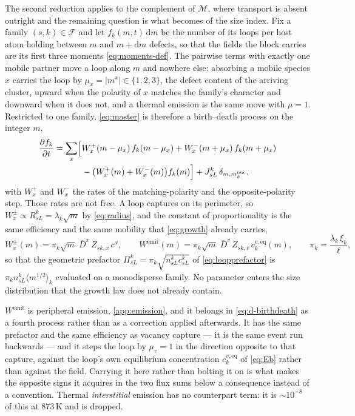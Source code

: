 The second reduction applies to the complement of $\mathcal M$, where transport
is absent outright and the remaining question is what becomes of the size index.
Fix a family $(s,k)\in\mathcal F$ and let $f_k(m,t)\,\mathrm dm$ be the number of
its loops per host atom holding between $m$ and $m+\mathrm dm$ defects, so that
the fields the block carries are its first three moments
\cref{eq:moments-def}. The pairwise terms with exactly one mobile partner move a
loop along $m$ and nowhere else: absorbing a mobile species $x$ carries the loop
by $\mu_x=|m^{x}|\in\{1,2,3\}$, the defect content of the arriving cluster,
upward when the polarity of $x$ matches the family's character and downward when
it does not, and a thermal emission is the same move with $\mu=1$. Restricted to
one family, \cref{eq:master} is therefore a birth--death process on the integer
$m$,
\begin{equation}
\begin{split}
  \frac{\partial f_k}{\partial t}=\sum_{x}\Bigl[
    &W^{+}_{x}(m-\mu_x)\,f_k(m-\mu_x)
    +W^{-}_{x}(m+\mu_x)\,f_k(m+\mu_x)\\
    &-\bigl(W^{+}_{x}(m)+W^{-}_{x}(m)\bigr)f_k(m)\Bigr]
    +J^k_{sL}\,\delta_{m,m^{\mathrm{nuc}}_k},
\end{split}
  \label{eq:d-birthdeath}
\end{equation}
with $W^{+}_{x}$ and $W^{-}_{x}$ the rates of the matching-polarity and the
opposite-polarity step. Those rates are not free. A loop captures on its
perimeter, so $W^{\pm}_{x}\propto R^k_{sL}=\lambda_k\sqrt m$ by
\cref{eq:radius}, and the constant of proportionality is the same efficiency and
the same mobility that \cref{eq:growth} already carries,
\begin{equation}
  W^{\pm}_{x}(m)=\pi_k\sqrt m\;\overline D^{x}\,Z_{sk,x}\,c^{x},
  \qquad
  W^{\mathrm{emit}}(m)=\pi_k\sqrt m\;\overline D^{v}\,Z_{sk,v}\,
    c^{v,\mathrm{eq}}_k(m),
  \qquad
  \pi_k=\frac{\lambda_k\,\xi_k}{\ell},
  \label{eq:d-Wrates}
\end{equation}
so that the geometric prefactor $\Pi^k_{sL}=\pi_k\sqrt{n^k_{sL}c^k_{sL}}$ of
\cref{eq:loopprefactor} is $\pi_kn^k_{sL}\langle m^{1/2}\rangle_k$ evaluated on a
monodisperse family. No parameter enters the size distribution that the growth
law does not already contain.

$W^{\mathrm{emit}}$ is peripheral emission, \cref{app:emission}, and it belongs
in \cref{eq:d-birthdeath} as a fourth process rather than as a correction
applied afterwards. It has the same prefactor and the same efficiency as vacancy
capture --- it is the same event run backwards --- and it steps the loop by
$\mu_v=1$ in the direction opposite to that capture, against the loop's own
equilibrium concentration $c^{v,\mathrm{eq}}_k$ of \cref{eq:Eb} rather than
against the field. Carrying it here rather than bolting it on is what makes the
opposite signs it acquires in the two flux sums below a consequence instead of a
convention. Thermal \emph{interstitial} emission has no counterpart term: it is
$\sim10^{-8}$ of this at $873\,$K and is dropped.

